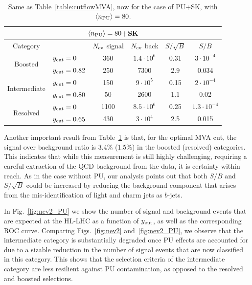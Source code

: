 \begin{table}[t]
  \centering
  \begin{tabular}{|c|l|c|c|c|c|}
        \hline
     \multicolumn{6}{|c|}{$\left\langle n_{\rm PU}\right\rangle=80$+SK} \\
     \hline
         \hline
    Category  &   &  $N_{\rm ev}$ signal &  $N_{\rm ev}$ back  &  $S/\sqrt{B}$ & $S/B$ \\ 
    \hline
    \hline
    \multirow{2}{*}{Boosted} &  $y_{\rm cut}=0$  & 360   &  $1.4\cdot 10^6$ & 0.31   &
     $3\cdot 10^{-4}$  \\
    &  $y_{\rm cut}=0.82$ &  250 & 7300  & 2.9    & 0.034  \\
    \hline
    \hline
    \multirow{2}{*}{Intermediate} &  $y_{\rm cut}=0$  &  150  & $9\cdot 10^5$    & 0.15    &
     $2\cdot 10^{-4}$ \\
    &  $y_{\rm cut}=0.80$ & 50 & 2600  &  1.1   & 0.02 \\
    \hline
    \hline
    \multirow{2}{*}{Resolved} &  $y_{\rm cut}=0$  &  1100  & $8.5\cdot 10^6$
    & 0.25    &  $1.3\cdot 10^{-4}$  \\
    &  $y_{\rm cut}=0.65$ & 430  & $3\cdot 10^4$  &  2.5   & 0.015  \\
    \hline
      \end{tabular}
  \caption{\small Same as Table~\ref{table:cutflowMVA}, now for the case
    of PU+SK, with $\left\langle n_{\rm PU}\right\rangle=80$.
        \label{table:cutflowMVA_PU}
  }
\end{table}

Another important result from Table~\ref{table:cutflowMVA_PU} is that,
for the optimal MVA cut, the signal over background ratio
is 3.4\% (1.5\%)
in the boosted (resolved) categories.
%
This indicates that while this measurement is still highly challenging,
requiring a careful extraction of the QCD
background from the data, it is certainty within reach.
%
As in the case without PU, 
our analysis  points out that both
$S/B$ and $S/\sqrt{B}$ could be increased  by reducing the background component
that arises from the mis-identification of light and charm
jets as $b$-jets.

In Fig.~\ref{fig:nev2_PU}
we show the number of signal and background events that
are expected at the HL-LHC as a function of
$y_{\rm cut}$, as well as the corresponding ROC curve.
%
Comparing Figs.~\ref{fig:nev2} and~\ref{fig:nev2_PU}, we observe
that the intermediate category is substantially degraded once PU effects
are accounted for due to a sizable
reduction in the number of signal
events that are now classified in this category.
%
This shows that the selection criteria
of the intermediate category are less
resilient against PU contamination,
as opposed to the resolved and boosted selections.


